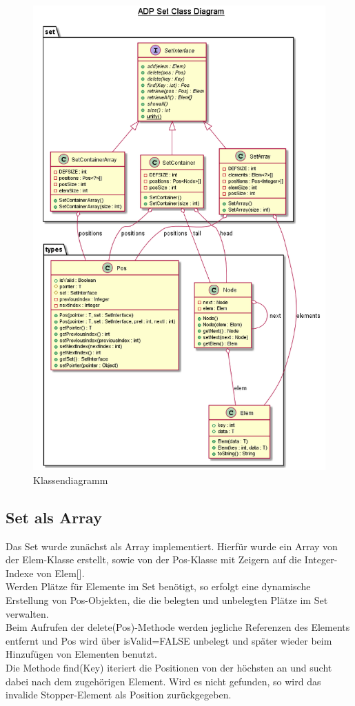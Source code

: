 \documentclass[11pt]{scrartcl}
\begin{document}
\begin{figure}[h!]
\includegraphics[width=\textwidth,height=\textheight,keepaspectratio]{BTI-ADP-SS19.png}
\caption{Klassendiagramm}
\label{figure:classdia}
\end{figure}

\subsection{Set als Array}
\label{sec:setArray}

Das Set wurde zunächst als Array implementiert. Hierfür wurde ein Array von der Elem-Klasse erstellt, sowie von der Pos-Klasse mit Zeigern auf die Integer-Indexe von Elem[].\\
Werden Plätze für Elemente im Set benötigt, so erfolgt eine dynamische Erstellung von Pos-Objekten, die die belegten und unbelegten Plätze im Set verwalten.\\
Beim Aufrufen der delete(Pos)-Methode werden jegliche Referenzen des Elements entfernt und Pos wird über isValid=FALSE unbelegt und später wieder beim Hinzufügen von Elementen benutzt.\\
Die Methode find(Key) iteriert die Positionen von der höchsten an und sucht dabei nach dem zugehörigen Element. Wird es nicht gefunden, so wird das invalide Stopper-Element als Position zurückgegeben.\\
\end{document}
